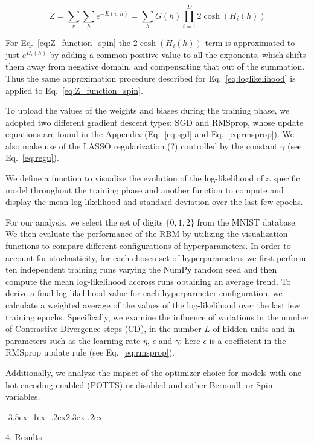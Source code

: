 \documentclass[prl,twocolumn]{revtex4-1}
\makeatletter
\renewcommand{\section}{\@startsection{section}{1}{\z@}%
	{-3.5ex \@plus -1ex \@minus -.2ex}{2.3ex \@plus.2ex}%
	{\normalfont\bfseries\raggedright}}
\makeatother
\begin{document}
\begin{equation}
	Z=\sum_v\sum_h{e^{-E(v,h)}}=\sum_h{G(h)\prod_{i=1}^D{2\cosh(H_i(h))}}
	\label{eq:Z_function_spin}
\end{equation}

For Eq.~\ref{eq:Z_function_spin} the $2\cosh(H_i(h))$ term is approximated to just $e^{H_i(h)}$ by adding a common positive value to all the exponents, which shifts them away from negative domain, and compensating that out of the summation. Thus the same approximation procedure described for Eq.~\ref{eq:loglikelihood} is applied to Eq.~\ref{eq:Z_function_spin}.

To upload the values of the weights and biases during the training phase, we adopted two different gradient descent types: SGD and RMSprop, whose update equations are found in the Appendix (Eq.~\ref{eq:sgd} and Eq.~\ref{eq:rmsprop}). We also make use of the LASSO regularization (?) controlled by the constant $\gamma$ (see Eq.~\ref{eq:regu}).

We define a function to visualize the evolution of the log-likelihood of a specific model throughout the training phase and another function to compute and display the mean log-likelihood and standard deviation over the last few epochs. 

For our analysis, we select the set of digits $\{0,1,2\}$ from the MNIST database. We then evaluate the performance of the RBM by utilizing the visualization functions to compare different configurations of hyperparameters. In order to account for stochasticity, for each chosen set of hyperparameters we first perform ten independent training runs varying the NumPy random seed and then compute the mean log-likelihood accross runs obtaining an average trend. To derive a final log-likelihood value for each hyperparmeter configuration, we calculate a weighted average of the values of the log-likelihood over the last few training epochs. Specifically, we examine the influence of variations in the number of Contrastive Divergence steps (CD), in the number $L$ of hidden units and in parameters such as the learning rate $\eta$, $\epsilon$ and $\gamma$; here $\epsilon$ is a coefficient in the RMSprop update rule (see Eq.~\ref{eq:rmsprop}).

Additionally, we analyze the impact of the optimizer choice for models with one-hot encoding enabled (POTTS) or disabled and either Bernoulli or Spin variables.


\section{4. Results}
\end{document}
